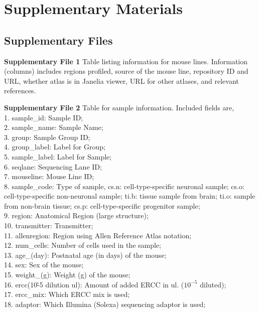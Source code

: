 \section{Supplementary Materials}

\subsection{Supplementary Files} 

\textbf{Supplementary File 1} Table listing information for mouse lines. Information (columns) includes regions profiled, source of the mouse line, repository ID and URL, whether atlas is in Janelia viewer, URL for other atlases, and relevant references.

\textbf{Supplementary File 2} Table for sample information. Included fields are, \\
1. sample\_id: Sample ID; \\
2. sample\_name: Sample Name; \\ 
3. group: Sample Group ID; \\
4. group\_label: Label for Group; \\
5. sample\_label: Label for Sample;  \\
6. seqlane: Sequencing Lane ID; \\
7. mouseline: Mouse Line ID; \\
8. sample\_code: Type of sample, cs.n: cell-type-specific neuronal sample; cs.o: cell-type-specific non-neuronal sample; ti.b: tissue sample from brain; ti.o: sample from non-brain tissue; cs.p: cell-type-specific progenitor sample; \\
9. region: Anatomical Region (large structure); \\
10. transmitter: Transmitter; \\
11. allenregion: Region using Allen Reference Atlas notation; \\
12. num\_cells: Number of cells used in the sample; \\
13. age\_(day): Postnatal age (in days) of the mouse; \\
14. sex: Sex of the mouse; \\
15. weight\_(g): Weight (g) of the mouse; \\
16. ercc(10\^-5 dilution ul): Amount of added ERCC in ul. ($10^{-5}$ diluted); \\
17. ercc\_mix: Which ERCC mix is used; \\
18. adaptor: Which Illumina (Solexa) sequencing adaptor is used; \\
